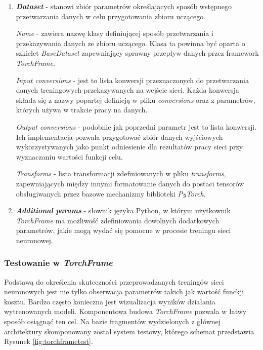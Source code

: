 \begin{enumerate}
    \item \textbf{\textit{Dataset}} - stanowi zbiór parametrów określających sposób
    wstępnego przetwarzania danych w celu przygotowania zbioru uczącego.

    \textit{Name} - zawiera nazwę klasy definiującej sposób przetwarzania
    i przekazywania danych ze zbioru uczącego. Klasa ta powinna być oparta o
    szkielet \textit{BaseDataset} zapewniający sprawny przepływ danych przez framework
    \textit{TorchFrame}.

    \textit{Input conversions} - jest to lista konwersji przeznaczonych do
    przetwarzania danych treningowych przekazywanych na wejście sieci. Każda
    konwersja składa się z nazwy popartej definicją w pliku \textit{conversions} oraz z
    parametrów, których używa w trakcie pracy na danych.

    \textit{Output conversions} - podobnie jak poprzedni parametr jest to lista
    konwersji. Ich implementacja pozwala przygotować zbiór danych wyjściowych
    wykorzystywanych jako punkt odniesienie dla rezultatów pracy sieci przy wyznaczaniu
    wartości funkcji celu.

    \textit{Transforms} - lista transformacji zdefiniowanych w pliku \textit{transforms},
    zapewniających między innymi formatowanie danych do postaci tensorów
    obsługiwanych przez bazowe mechanizmy biblioteki \textit{PyTorch}.

    \item \textbf{\textit{Additional params}} - słownik języka Python, w którym użytkownik
    \textit{TorchFrame} ma możliwość zdefiniowania dowolnych dodatkowych parametrów, jakie
    mogą wydać się pomocne w procesie treningu sieci neuronowej.

    \end{enumerate}

  \subsubsection{Testowanie w \textit{TorchFrame}}
    Podstawą do określenia skuteczności przeprowadzanych treningów sieci neuronowych
    jest nie tylko obserwacja parametrów takich jak wartość funckji kosztu. Bardzo
    często konieczna jest wizualizacja wyników działania wytrenowanych modeli.
    Komponentowa budowa \textit{TorchFrame} pozwala w łatwy sposób osiągnąć ten cel.
    Na bazie fragmentów wydzielonych z głównej architektury skomponowany został
    system testowy, którego schemat przedstawia Rysunek \ref{fig:torchframetest}.

